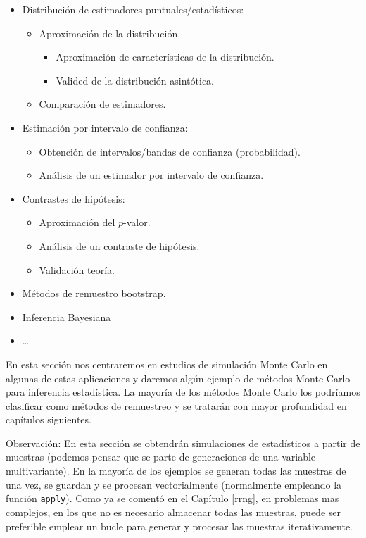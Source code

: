\documentclass[
]{book}
\theoremstyle{break}
\theoremstyle{nonumberplain}
\begin{document}
\begin{itemize}
\item
  Distribución de estimadores puntuales/estadísticos:

  \begin{itemize}
  \item
    Aproximación de la distribución.

    \begin{itemize}
    \item
      Aproximación de características de la distribución.
    \item
      Valided de la distribución asintótica.
    \end{itemize}
  \item
    Comparación de estimadores.
  \end{itemize}
\item
  Estimación por intervalo de confianza:

  \begin{itemize}
  \item
    Obtención de intervalos/bandas de confianza (probabilidad).
  \item
    Análisis de un estimador por intervalo de confianza.
  \end{itemize}
\item
  Contrastes de hipótesis:

  \begin{itemize}
  \item
    Aproximación del \(p\)-valor.
  \item
    Análisis de un contraste de hipótesis.
  \item
    Validación teoría.
  \end{itemize}
\item
  Métodos de remuestro bootstrap.
\item
  Inferencia Bayesiana
\item
  \ldots{}
\end{itemize}

En esta sección nos centraremos en estudios de simulación Monte Carlo en algunas de estas aplicaciones y daremos algún ejemplo de métodos Monte Carlo para inferencia estadística.
La mayoría de los métodos Monte Carlo los podríamos clasificar como métodos de remuestreo y se tratarán con mayor profundidad en capítulos siguientes.

Observación:
En esta sección se obtendrán simulaciones de estadísticos a partir de muestras (podemos pensar que se parte de generaciones de una variable multivariante).
En la mayoría de los ejemplos se generan todas las muestras de una vez, se guardan y se procesan vectorialmente (normalmente empleando la función \texttt{apply}).
Como ya se comentó en el Capítulo \ref{rrng}, en problemas mas complejos, en los que no es necesario almacenar todas las muestras, puede ser preferible emplear un bucle para generar y procesar las muestras iterativamente.
\end{document}
